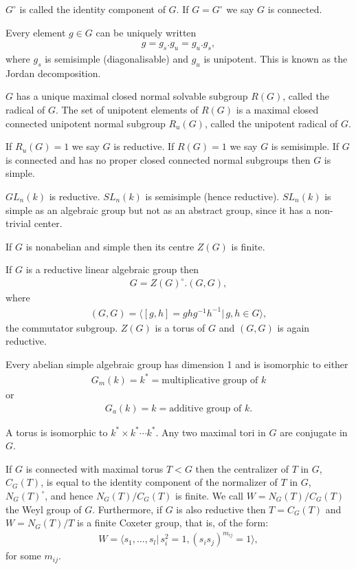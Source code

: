 $G^\circ$ is called the identity component of $G$. If $G = G^\circ$ we say $G$ is connected.

Every element $g\in G$ can be uniquely written
\begin{align}
	g = g_s.g_u = g_u.g_s,
\end{align}
where $g_s$ is semisimple (diagonalisable) and $g_u$ is unipotent. This is known as the Jordan decomposition.

$G$ has a unique maximal closed normal solvable subgroup $R(G)$, called the radical of $G$. The set of unipotent elements of $R(G)$ is a maximal closed connected unipotent normal subgroup $R_u(G)$, called the unipotent radical of $G$.

If $R_u(G) = {1}$ we say $G$ is reductive. If $R(G) = {1}$ we say $G$ is semisimple. If $G$ is connected and has no proper closed connected normal subgroups then $G$ is simple.

\begin{example}
	$GL_n(k)$ is reductive. $SL_n(k)$ is semisimple (hence reductive). $SL_n(k)$ is simple as an algebraic group but not as an abstract group, since it has a non-trivial center.
\end{example}

If $G$ is nonabelian and simple then its centre $Z(G)$ is finite.

If $G$ is a reductive linear algebraic group then
\begin{align}
	G = Z(G)^\circ.(G,G),
\end{align}
where
\begin{align}
	(G,G) = \langle [g, h] = ghg^{-1}h^{-1}|\,g,h\in G\rangle,
\end{align}
the commutator subgroup. $Z(G)$ is a torus of $G$ and $(G, G)$ is again reductive.

Every abelian simple algebraic group has dimension 1 and is isomorphic to either
\begin{align}
	G_m(k) = k^* = \textrm{multiplicative group of }k
\end{align}
or
\begin{align}
	G_a(k) = k = \textrm{additive group of }k.
\end{align}

A torus is isomorphic to $k^*\times k^*\cdots k^*$. Any two maximal tori in $G$ are conjugate in $G$. 

If $G$ is connected with maximal torus $T<G$ then the centralizer of $T$ in $G$, $C_G(T)$, is equal to the identity component of the normalizer of $T$ in $G$, $N_G(T)^\circ$, and hence $N_G(T)/C_G(T)$ is finite. We call $W = N_G(T)/C_G(T)$ the Weyl group of $G$. Furthermore, if $G$ is also reductive then $T=C_G(T)$ and $W = N_G(T)/T$ is a finite Coxeter group, that is, of the form:
\begin{align}
  W = \langle s_1, \ldots, s_l |\, s_i^2 = 1, (s_is_j)^{m_{ij}} = 1\rangle,
\end{align}
for some $m_{ij}$.

